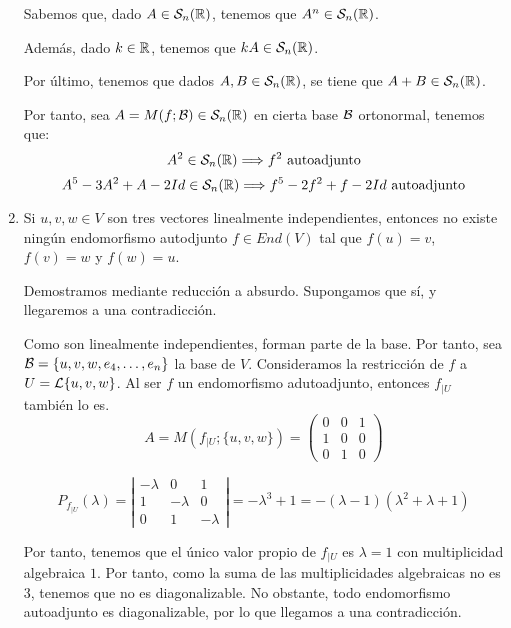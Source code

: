 \begin{ejercicio}
\begin{enumerate}
        Sabemos que, dado $A\in \mathcal{S}_n(\mathbb{R})$, tenemos que $A^n\in \mathcal{S}_n(\mathbb{R})$.

        Además, dado $k\in \mathbb{R}$, tenemos que $kA\in \mathcal{S}_n(\mathbb{R})$.

        Por último, tenemos que dados $A,B\in \mathcal{S}_n(\mathbb{R})$, se tiene que $A+B\in \mathcal{S}_n(\mathbb{R})$.

        Por tanto, sea $A=M(f;\mathcal{B})\in \mathcal{S}_n(\mathbb{R})$ en cierta base $\mathcal{B}$ ortonormal, tenemos que:
        \begin{equation*}
            A^2\in \mathcal{S}_n(\mathbb{R}) \Longrightarrow f^2 \text{ autoadjunto}
        \end{equation*}
        \begin{equation*}
            A^5-3A^2+A-2Id\in \mathcal{S}_n(\mathbb{R}) \Longrightarrow f^5-2f^2+f-2Id \text{ autoadjunto}
        \end{equation*}
        
        \item Si $u,v,w \in V$ son tres vectores linealmente independientes, entonces no existe ningún endomorfismo autodjunto $f\in End(V)$ tal que $f(u) = v$, $f(v) = w$ y $f(w) = u$.

        Demostramos mediante reducción a absurdo. Supongamos que sí, y llegaremos a una contradicción.

        Como son linealmente independientes, forman parte de la base. Por tanto, sea $\mathcal{B}=\{u,v,w, e_4,\dots,e_n\}$ la base de $V$. Consideramos la restricción de $f$ a $U=\mathcal{L}\{u,v,w\}$. Al ser $f$ un endomorfismo adutoadjunto, entonces $f_{\big| U}$ también lo es.
        \begin{equation*}
            A = M\left(f_{\big| U};\{u,v,w\}\right)=\left(\begin{array}{ccc}
                0 & 0 & 1 \\
                1 & 0 & 0 \\
                0 & 1 & 0
            \end{array}\right)
        \end{equation*}

        \begin{equation*}
            P_{f_{\big| U}}(\lambda) = \left|\begin{array}{ccc}
                -\lambda & 0 & 1 \\
                1 & -\lambda & 0 \\
                0 & 1 & -\lambda
            \end{array}\right| = -\lambda^3 + 1 = -(\lambda -1)(\lambda^2 + \lambda + 1)
        \end{equation*}

        Por tanto, tenemos que el único valor propio de $f_{\big| U}$ es $\lambda = 1$ con multiplicidad algebraica $1$. Por tanto, como la suma de las multiplicidades algebraicas no es 3, tenemos que no es diagonalizable. No obstante, todo endomorfismo autoadjunto es diagonalizable, por lo que llegamos a una contradicción.
    \end{enumerate}
\end{ejercicio}


